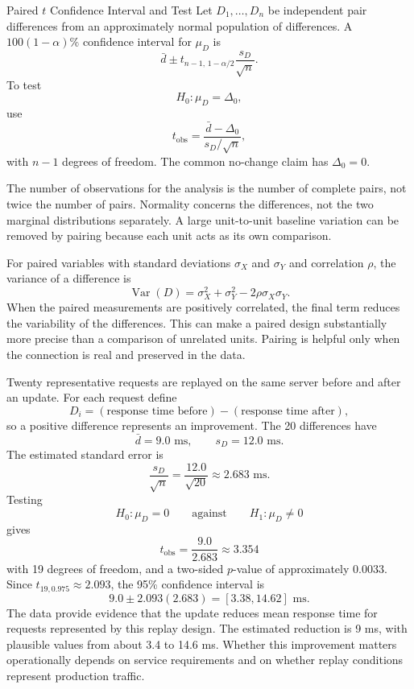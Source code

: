 \newpage

\begin{theorem}{Paired $t$ Confidence Interval and Test}
Let $D_1,\ldots,D_n$ be independent pair differences from an approximately normal population of differences. A $100(1-\alpha)\%$ confidence interval for $\mu_D$ is
\[
\bar d
\pm
t_{n-1,\,1-\alpha/2}\frac{s_D}{\sqrt n}.
\]
To test
\[
H_0:\mu_D=\Delta_0,
\]
use
\[
t_{\mathrm{obs}}
=
\frac{\bar d-\Delta_0}{s_D/\sqrt n},
\]
with $n-1$ degrees of freedom. The common no-change claim has $\Delta_0=0$.
\end{theorem}

The number of observations for the analysis is the number of complete pairs, not twice the number of pairs. Normality concerns the differences, not the two marginal distributions separately. A large unit-to-unit baseline variation can be removed by pairing because each unit acts as its own comparison.

For paired variables with standard deviations $\sigma_X$ and $\sigma_Y$ and correlation $\rho$, the variance of a difference is
\[
\operatorname{Var}(D)
=\sigma_X^2+\sigma_Y^2-2\rho\sigma_X\sigma_Y.
\]
When the paired measurements are positively correlated, the final term reduces the variability of the differences. This can make a paired design substantially more precise than a comparison of unrelated units. Pairing is helpful only when the connection is real and preserved in the data.

\begin{example}\par
Twenty representative requests are replayed on the same server before and after an update. For each request define
\[
D_i=(\text{response time before})-(\text{response time after}),
\]
so a positive difference represents an improvement. The 20 differences have
\[
\bar d=9.0\text{ ms},
\qquad
s_D=12.0\text{ ms}.
\]
The estimated standard error is
\[
\frac{s_D}{\sqrt n}
=\frac{12.0}{\sqrt{20}}
\approx2.683\text{ ms}.
\]
Testing
\[
H_0:\mu_D=0
\qquad\text{against}\qquad
H_1:\mu_D\neq0
\]
gives
\[
t_{\mathrm{obs}}
=\frac{9.0}{2.683}
\approx3.354
\]
with 19 degrees of freedom, and a two-sided $p$-value of approximately $0.0033$. Since $t_{19,0.975}\approx2.093$, the 95\% confidence interval is
\[
9.0\pm2.093(2.683)
=[3.38,14.62]\text{ ms}.
\]
The data provide evidence that the update reduces mean response time for requests represented by this replay design. The estimated reduction is 9 ms, with plausible values from about 3.4 to 14.6 ms. Whether this improvement matters operationally depends on service requirements and on whether replay conditions represent production traffic.
\end{example}

